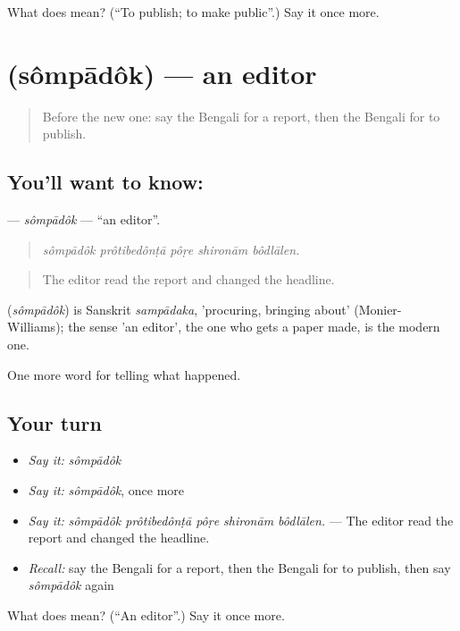 \begin{tcolorbox}[breakable,colback=teal!4,colframe=teal!35!black,title={Before you move on}]
What does   mean? (\textquotedblleft{}To publish; to make public\textquotedblright{}.) Say it once more.
\end{tcolorbox}
\section[\texorpdfstring{\bn{সম্পাদক} (sômpādôk)}{সম্পাদক (sômpādôk)}]{ (sômpādôk) — an editor}

\label{lesson:BN-C296-sompadok}



\begin{quote}
Before the new one: say the Bengali for a report, then the Bengali for to publish.
\end{quote}

\subsection*{You'll want to know: }
\textbf{} — \emph{sômpādôk} — \textquotedblleft{}an editor\textquotedblright{}.

\begin{quote}
    
\end{quote}

\begin{quote}
\emph{sômpādôk prôtibedônṭā pôṛe shironām bôdlālen.}
\end{quote}

\begin{quote}
The editor read the report and changed the headline.
\end{quote}

\begin{cousinweb}
\textbf{} (\emph{sômpādôk}) is Sanskrit \emph{sampādaka}, 'procuring, bringing about' (Monier-Williams); the sense 'an editor', the one who gets a paper made, is the modern one.
\end{cousinweb}

\begin{grammarlens}[title={What you've built}]
One more word for telling what happened.
\end{grammarlens}

\subsection*{Your turn}
\begin{itemize}
\raggedright
  \item \emph{Say it:} \emph{sômpādôk}
  \item \emph{Say it:} \emph{sômpādôk}, once more
  \item \emph{Say it:} \emph{sômpādôk prôtibedônṭā pôṛe shironām bôdlālen.} — The editor read the report and changed the headline.
  \item \emph{Recall:} say the Bengali for a report, then the Bengali for to publish, then say \emph{sômpādôk} again
\end{itemize}

\begin{tcolorbox}[breakable,colback=teal!4,colframe=teal!35!black,title={Before you move on}]
What does  mean? (\textquotedblleft{}An editor\textquotedblright{}.) Say it once more.
\end{tcolorbox}
